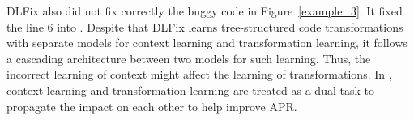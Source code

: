 DLFix also did not fix correctly the buggy code in
Figure~\ref{example_3}. It fixed the line 6 into 
    \code{\%}
. Despite that DLFix learns tree-structured code
transformations with separate models for context learning and
transformation learning, it follows a cascading architecture between
two models for such learning. Thus, the incorrect learning of context
might affect the learning of transformations. In {\tool}, context
learning and transformation learning are treated as a dual task
to propagate the impact on each other to help improve APR.












